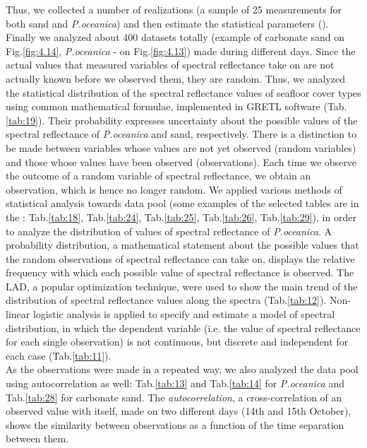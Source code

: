 \documentclass[11pt]{article}
\begin{document}
Thus, we collected a number of realizations (a sample of 25 measurements for both sand and \textit{P.oceanica}) and then estimate the statistical parameters (). \\
Finally we analyzed about 400 datasets totally (example of carbonate sand on Fig.\ref{fig:4.14}, \textit{P.oceanica} - on  Fig.\ref{fig:4.13}) made during different days. Since the actual values that measured variables of spectral reflectance take on are not actually known before we observed them, they are random. Thus, we analyzed the statistical distribution of the spectral reflectance values of seafloor cover types using common mathematical formulae, implemented in \ac{GRETL} software (Tab.\ref{tab:19}). 
Their probability expresses uncertainty about the possible values of the spectral reflectance of \textit{P.oceanica} and sand, respectively.
There is a distinction to be made between variables whose values are not yet observed (random variables) and those whose values have been observed (observations). 
Each time we observe the outcome of a random variable of spectral reflectance, we obtain an observation, which is hence no longer random. 
\label{statistics-1}
We applied various methods of statistical analysis towards data pool (some examples of the selected tables are in the \label{page-41}: Tab.\ref{tab:18}, Tab.\ref{tab:24}, Tab.\ref{tab:25}, Tab.\ref{tab:26}, Tab.\ref{tab:29}), in order to analyze the distribution of values of spectral reflectance of \textit{P.oceanica}. 
A probability distribution, a mathematical statement about the possible values that the random observations of spectral reflectance can take on, displays the relative frequency with which each possible value of spectral reflectance is observed. 
The \ac{LAD}, a popular optimization technique, were used to show the main trend of the distribution of spectral reflectance values along the spectra (Tab.\ref{tab:12}). Non-linear logistic analysis is applied to specify and estimate a model of spectral distribution, in which the dependent variable (i.e. the value of spectral reflectance for each single observation) is not continuous, but discrete and independent for each case (Tab.\ref{tab:11}). \\
As the observations were made in a repeated way, we also analyzed the data pool using autocorrelation as well: Tab.\ref{tab:13} and Tab.\ref{tab:14} for \textit{P.oceanica} and Tab.\ref{tab:28} for carbonate sand. The \textit{autocorrelation}, a cross-correlation of an observed value with itself, made on two different days (14th and 15th October), shows the similarity between observations as a function of the time separation between them. 
\end{document}
